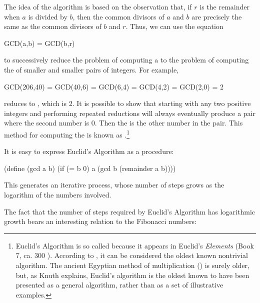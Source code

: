 The idea of the algorithm is based on the observation that, if \( r \) is the
remainder when \( a \) is divided by \( b \), then the common divisors of \( a \) and
\( b \) are precisely the same as the common divisors of \( b \) and \( r \).  Thus,
we can use the equation

\begin{example}
GCD(a,b) = GCD(b,r)
\end{example}

\noindent
to successively reduce the problem of computing a  to the problem
of computing the  of smaller and smaller pairs of integers.  For
example,

\begin{example}
GCD(206,40) = GCD(40,6)
            = GCD(6,4)
            = GCD(4,2)
            = GCD(2,0)
            = 2
\end{example}

\noindent
reduces  to , which is 2.  It is
possible to show that starting with any two positive integers and performing
repeated reductions will always eventually produce a pair where the second
number is 0.  Then the  is the other number in the pair.  This
method for computing the  is known as .\footnote{Euclid's Algorithm is so called because it appears in
Euclid's \textit{Elements} (Book 7, ca. 300 ).  According to ,
it can be considered the oldest known nontrivial algorithm.  The
ancient Egyptian method of multiplication () is surely
older, but, as Knuth explains, Euclid's algorithm is the oldest known to have
been presented as a general algorithm, rather than as a set of illustrative
examples.}

It is easy to express Euclid's Algorithm as a procedure:

\begin{codeBlock}
(define (gcd a b)
  (if (= b 0)
      a
      (gcd b (remainder a b))))
\end{codeBlock}

\noindent
This generates an iterative process, whose number of steps grows as the
logarithm of the numbers involved.

The fact that the number of steps required by Euclid's Algorithm has
logarithmic growth bears an interesting relation to the Fibonacci numbers:

